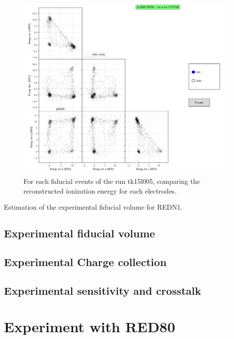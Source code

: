 \begin{figure}
\centering
\includegraphics[width=\linewidth]{Figures/Electrodes/redn1_ion_vs_ion.png}
\caption{For each fiducial events of the run tk15l005, comparing the reconstructed ionization energy for each electrodes.}
\label{fig:redn1-ion-vs-ion}
\end{figure}

\begin{table}[]
\centering
\resizebox{\linewidth}{!}{
	
}
\caption{Estimation of the experimental fiducial volume for REDN1.}
\label{tab:stream-glitch-time-cut}
\end{table}

\subsection{Experimental fiducial volume}

\subsection{Experimental Charge collection}

\subsection{Experimental sensitivity and crosstalk}


\section{Experiment with RED80}

